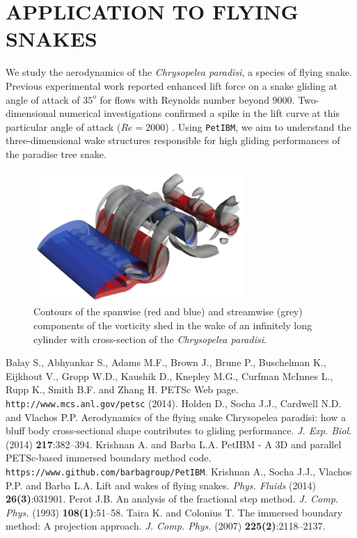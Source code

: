 \documentclass{parcfd2015}
\begin{document}
\section{APPLICATION TO FLYING SNAKES}

We study the aerodynamics of the \textit{Chrysopelea paradisi}, a species of flying snake. Previous experimental work \cite{Holden_et_al_2014} reported enhanced lift force on a snake gliding at angle of attack of $35^o$ for flows with Reynolds number beyond $9000$. Two-dimensional numerical investigations confirmed a spike in the lift curve at this particular angle of attack ($Re=2000$) \cite{Krishnan_et_al_2014}. Using \texttt{PetIBM}, we aim to understand the three-dimensional wake structures responsible for high gliding performances of the paradise tree snake.

\begin{figure}[h!]
\centering
\includegraphics[width=8cm]{images/flying_snake_petibm.png}
\caption{Contours of the spanwise (red and blue) and streamwise (grey) components of the vorticity shed in the wake of an infinitely long cylinder with cross-section of the \textit{Chrysopelea paradisi}.}
\label{flying_snake_petibm}
\end{figure}

\begin{thebibliography}{99}
 Balay S., Abhyankar S., Adams M.F., Brown J., Brune P., Buschelman K., Eijkhout V., Gropp W.D., Kaushik D., Knepley M.G., Curfman McInnes L., Rupp K., Smith B.F. and Zhang H. PETSc Web page. \texttt{http://www.mcs.anl.gov/petsc} (2014).
 Holden D., Socha J.J., Cardwell N.D. and Vlachos P.P. Aerodynamics of the flying snake Chrysopelea paradisi: how a bluff body cross-sectional shape contributes to gliding performance. \textit{J. Exp. Biol.} (2014) \textbf{217}:382--394.
 Krishnan A. and Barba L.A. PetIBM - A 3D and parallel PETSc-based immersed boundary method code. \texttt{https://www.github.com/barbagroup/PetIBM}.
 Krishnan A., Socha J.J., Vlachos P.P. and Barba L.A. Lift and wakes of flying snakes. \textit{Phys. Fluids} (2014) \textbf{26(3)}:031901.
 Perot J.B. An analysis of the fractional step method. \textit{J. Comp. Phys.} (1993) \textbf{108(1)}:51--58.
 Taira K. and Colonius T. The immersed boundary method: A projection approach. \textit{J. Comp. Phys.} (2007) \textbf{225(2)}:2118--2137.
\end{thebibliography}
\end{document}
